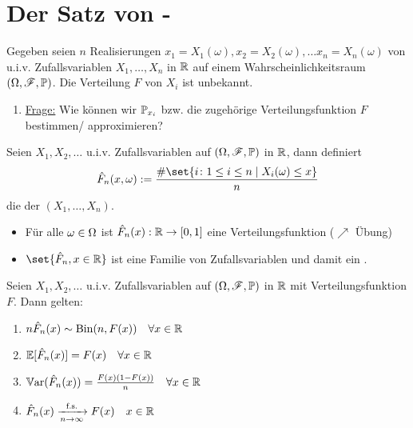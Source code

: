 \section{Der Satz von -}
Gegeben seien $n$ Realisierungen $x_1 = X_1(\omega), x_2 = X_2(\omega), \dots x_n = X_n(\omega)$ von u.i.v. Zufallsvariablen $X_1,\dots, X_n$ in $\R$ auf einem Wahrscheinlichkeitsraum $(\O, \F, \P)$. Die Verteilung $F$ von $X_i$ ist unbekannt.
\begin{enumerate}[label=]
	\item \ul{Frage:} Wie können wir $\P_{x_i}$ bzw. die zugehörige Verteilungsfunktion $F$ bestimmen/ approximieren?
\end{enumerate}
\begin{definition}
	Seien $X_1,X_2, \dots$ u.i.v. Zufallsvariablen auf $(\O,\F,\P)$ in $\R$, dann definiert
	\begin{align*}
		\hat{F}_n(x,\omega) := \frac{\# \set{ i\colon 1 \le i \le n \mid X_i(\omega) \le x}}{n}
	\end{align*}
	die  der  $(X_1, \dots, X_n)$.
\end{definition}
\begin{*remark}
	\begin{itemize}
		\item Für alle $\omega \in \O$ ist $\hat{F}_n(x): \R \to [0,1]$ eine Verteilungsfunktion ($\nearrow$ Übung)
		\item $\set{\hat{F}_n, x \in \R}$ ist eine Familie von Zufallsvariablen und damit ein .
	\end{itemize}
\end{*remark}
\begin{proposition}
	 Seien $X_1, X_2, \dots$ u.i.v. Zufallsvariablen auf $(\O,\F,\P)$ in $\R$ mit Verteilungsfunktion $F$. Dann gelten:
	\begin{enumerate}
		\item $n \hat{F}_n(x) \sim \Bin(n,F(x)) \quad \forall x\in \R$
		\item $\E[\hat{F}_n(x)] = F(x) \quad \forall x \in \R$
		\item $\Var(\hat{F}_n(x)) = \frac{F(x)(1-F(x))}{n} \quad \forall x \in \R$
		\item $\hat{F}_n(x) \xrightarrow[n \to \infty]{\text{f.s.}} F(x) \quad x \in \R$
	\end{enumerate}
\end{proposition}
